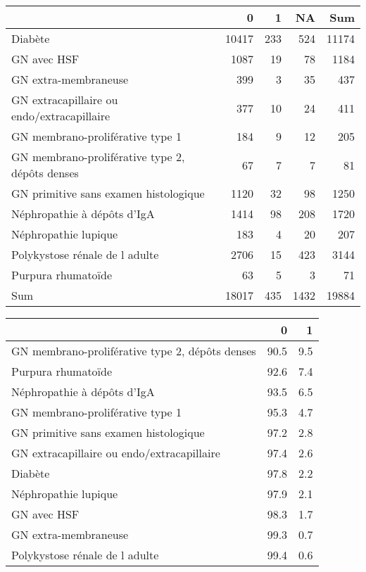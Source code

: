 \documentclass[11pt,a4paper]{article}\usepackage[]{graphicx}\usepackage[]{color}
\begin{document}
\begin{table}[H]
\centering
\begin{tabular}{lrrrr}
  \hline
 & 0 & 1 & NA & Sum \\ 
  \hline
Diabète & 10417 & 233 & 524 & 11174 \\ 
  GN avec HSF & 1087 & 19 & 78 & 1184 \\ 
  GN extra-membraneuse & 399 & 3 & 35 & 437 \\ 
  GN extracapillaire ou endo/extracapillaire & 377 & 10 & 24 & 411 \\ 
  GN membrano-proliférative type 1 & 184 & 9 & 12 & 205 \\ 
  GN membrano-proliférative type 2, dépôts denses & 67 & 7 & 7 & 81 \\ 
  GN primitive sans examen histologique & 1120 & 32 & 98 & 1250 \\ 
  Néphropathie à dépôts d'IgA & 1414 & 98 & 208 & 1720 \\ 
  Néphropathie lupique & 183 & 4 & 20 & 207 \\ 
  Polykystose rénale de l adulte & 2706 & 15 & 423 & 3144 \\ 
  Purpura rhumatoïde & 63 & 5 & 3 & 71 \\ 
  Sum & 18017 & 435 & 1432 & 19884 \\ 
   \hline
\end{tabular}
\end{table}
\begin{table}[H]
\centering
\begin{tabular}{lrr}
  \hline
 & 0 & 1 \\ 
  \hline
GN membrano-proliférative type 2, dépôts denses & 90.5 & 9.5 \\ 
  Purpura rhumatoïde & 92.6 & 7.4 \\ 
  Néphropathie à dépôts d'IgA & 93.5 & 6.5 \\ 
  GN membrano-proliférative type 1 & 95.3 & 4.7 \\ 
  GN primitive sans examen histologique & 97.2 & 2.8 \\ 
  GN extracapillaire ou endo/extracapillaire & 97.4 & 2.6 \\ 
  Diabète & 97.8 & 2.2 \\ 
  Néphropathie lupique & 97.9 & 2.1 \\ 
  GN avec HSF & 98.3 & 1.7 \\ 
  GN extra-membraneuse & 99.3 & 0.7 \\ 
  Polykystose rénale de l adulte & 99.4 & 0.6 \\ 
   \hline
\end{tabular}
\end{table}
\end{document}
